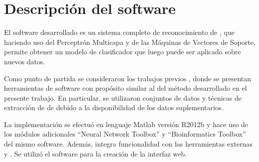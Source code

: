 %
%
%
%
\chapter{Descripción del software}
%
El software desarrollado es un sistema completo de reconocimiento de
, que haciendo uso del Perceptrón Multicapa y de las
Máquinas de Vectores de Soporte, permite obtener un modelo de
clasificador que luego puede ser aplicado sobre nuevos datos.

Como punto de partida se consideraron los trabajos previos
\cite{xue,ng,batuwita,sheng,sewer,ding}, donde se presentan
herramientas de software con propósito similar al del método
desarrollado en el presente trabajo.
En particular, se utilizaron conjuntos de datos y técnicas de
extracción de  de \cite{xue,ng,batuwita} debido a la
disponibilidad de los datos suplementarios.

La implementación se efectuó en lenguaje Matlab versión R2012b y hace
uso de los módulos adicionales ``Neural Network Toolbox'' y
``Bioinformatics Toolbox'' del mismo software.
Además, integra funcionalidad con las herramientas externas
 \cite{libsvm} y  \cite{vienna}.
Se utilizó el software \work\webdemo{} \cite{webdemobuilder} para
la creación de la interfaz web.
